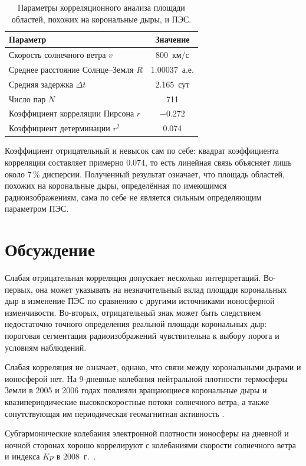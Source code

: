 \documentclass[11pt,a4paper]{article}
\begin{document}
\begin{table}[htbp]
\centering
\caption{Параметры корреляционного анализа площади областей, похожих на
корональные дыры, и ПЭС.}
\label{tab:result}
\begin{tabular}{lc}
\toprule
Параметр & Значение \\
\midrule
Скорость солнечного ветра $v$ & 800~км/с \\
Среднее расстояние Солнце--Земля $R$ & 1.00037~а.е. \\
Средняя задержка $\Delta t$ & 2.165~сут \\
Число пар $N$ & 711 \\
Коэффициент корреляции Пирсона $r$ & $-0.272$ \\
Коэффициент детерминации $r^2$ & 0.074 \\
\bottomrule
\end{tabular}
\end{table}

Коэффициент отрицательный и невысок сам по себе: квадрат коэффициента
корреляции составляет примерно 0.074, то есть линейная связь объясняет лишь
около 7\,\% дисперсии. Полученный результат означает, что площадь областей,
похожих на корональные дыры, определённая по имеющимся радиоизображениям,
сама по себе не является сильным определяющим параметром ПЭС.

\section{Обсуждение}

Слабая отрицательная корреляция допускает несколько интерпретаций.
Во-первых, она может указывать на незначительный вклад площади корональных
дыр в изменение ПЭС по сравнению с другими источниками ионосферной
изменчивости. Во-вторых, отрицательный знак может быть следствием
недостаточно точного определения реальной площади корональных дыр: пороговая
сегментация радиоизображений чувствительна к выбору порога и условиям
наблюдений.



Слабая корреляция не означает, однако, что связи между корональными дырами
и ионосферой нет. На 9-дневные колебания нейтральной плотности термосферы Земли в 2005 и 2006 
годах повлияли вращающиеся корональные дыры и квазипериодические высокоскоростные 
потоки солнечного ветра, а также сопутствующая им периодическая геомагнитная активность \citep{fang2012recurrent}.


Субгармонические колебания электронной плотности ионосферы на дневной и
ночной сторонах хорошо коррелируют с колебаниями скорости солнечного ветра
и индекса $Kp$ в 2008~г.\ \citep{tulasiram2010periodic}. 
\end{document}

